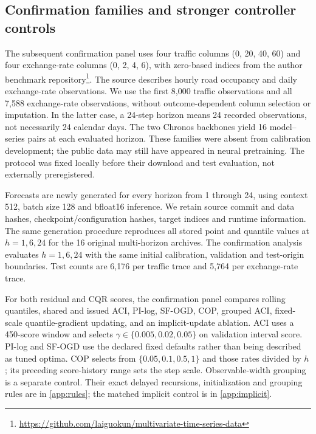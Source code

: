 \documentclass[preprint,11pt]{elsarticle}
\begin{document}
\subsection{Confirmation families and stronger controller controls}\label{sec:confirmationdesign}
The subsequent confirmation panel uses four traffic columns (0, 20, 40, 60) and four
exchange-rate columns (0, 2, 4, 6), with zero-based indices from the author benchmark
repository\footnote{\url{https://github.com/laiguokun/multivariate-time-series-data}}.
The source describes hourly road occupancy and daily exchange-rate observations.
We use the first 8,000 traffic observations and all 7,588 exchange-rate observations,
without outcome-dependent column selection or imputation. In the latter case, a
24-step horizon means 24 recorded observations, not necessarily 24 calendar days.
The two Chronos backbones yield 16 model--series pairs at each evaluated horizon.
These families were absent from calibration development; the public data may still
have appeared in neural pretraining. The protocol was fixed locally before their
download and test evaluation, not externally preregistered.

Forecasts are newly generated for every horizon from 1 through 24, using context 512,
batch size 128 and bfloat16 inference. We retain source commit and data hashes,
checkpoint/configuration hashes, target indices and runtime information. The same
generation procedure reproduces all stored point and quantile values at $h=1,6,24$
for the 16 original multi-horizon archives. The confirmation analysis evaluates
$h=1,6,24$ with the same initial calibration, validation and test-origin boundaries.
Test counts are 6,176 per traffic trace and 5,764 per exchange-rate trace.

For both residual and CQR scores, the confirmation panel compares rolling quantiles,
shared and issued ACI, PI-log, SF-OGD, COP, grouped ACI, fixed-scale quantile-gradient
updating, and an implicit-update ablation. ACI uses a 450-score window and selects
$\gamma\in\{0.005,0.02,0.05\}$ on validation interval score. PI-log and SF-OGD use
the declared fixed defaults rather than being described as tuned optima.
COP selects from $\{0.05,0.1,0.5,1\}$ and those rates divided by $h$; its preceding
score-history range sets the step scale. Observable-width grouping is a separate
control. Their exact delayed recursions, initialization and grouping rules are in
\ref{app:rules}; the matched implicit control is in \ref{app:implicit}.
\end{document}
